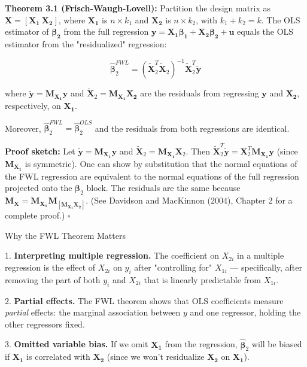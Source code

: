 \textbf{Theorem 3.1 (Frisch-Waugh-Lovell):} Partition the design matrix as $\mathbf{X} = [\mathbf{X_1} \: \mathbf{X_2}]$, where $\mathbf{X_1}$ is $n \times k_1$ and $\mathbf{X_2}$ is $n \times k_2$, with $k_1 + k_2 = k$. The OLS estimator of $\boldsymbol{\beta_2}$ from the full regression $\mathbf{y} = \mathbf{X_1}\boldsymbol{\beta_1} + \mathbf{X_2}\boldsymbol{\beta_2} + \mathbf{u}$ equals the OLS estimator from the "residualized" regression:

\[
\hat{\boldsymbol{\beta}}_2^{FWL} = (\tilde{\mathbf{X}}_2^T \tilde{\mathbf{X}}_2)^{-1} \tilde{\mathbf{X}}_2^T \tilde{\mathbf{y}}
\]

where $\tilde{\mathbf{y}} = \mathbf{M_{X_1}}\mathbf{y}$ and $\tilde{\mathbf{X}}_2 = \mathbf{M_{X_1}}\mathbf{X_2}$ are the residuals from regressing $\mathbf{y}$ and $\mathbf{X_2}$, respectively, on $\mathbf{X_1}$.

Moreover, $\hat{\boldsymbol{\beta}}_2^{FWL} = \hat{\boldsymbol{\beta}}_2^{OLS}$ and the residuals from both regressions are identical.

\textbf{Proof sketch:} Let $\tilde{\mathbf{y}} = \mathbf{M_{X_1}}\mathbf{y}$ and $\tilde{\mathbf{X}}_2 = \mathbf{M_{X_1}}\mathbf{X}_2$. Then $\tilde{\mathbf{X}}_2^T\tilde{\mathbf{y}} = \mathbf{X}_2^T\mathbf{M_{X_1}}\mathbf{y}$ (since $\mathbf{M_{X_1}}$ is symmetric). One can show by substitution that the normal equations of the FWL regression are equivalent to the normal equations of the full regression projected onto the $\boldsymbol{\beta}_2$ block. The residuals are the same because $\mathbf{M_X} = \mathbf{M_{X_1}}\mathbf{M}_{[\mathbf{M_{X_1}}\mathbf{X_2}]}$. (See Davidson and MacKinnon (2004), Chapter 2 for a complete proof.) $\square$

\begin{keybox}{Why the FWL Theorem Matters}

1. \textbf{Interpreting multiple regression.} The coefficient on $X_{2i}$ in a multiple regression is the effect of $X_{2i}$ on $y_i$ after "controlling for" $X_{1i}$ --- specifically, after removing the part of both $y_i$ and $X_{2i}$ that is linearly predictable from $X_{1i}$.

2. \textbf{Partial effects.} The FWL theorem shows that OLS coefficients measure \textit{partial} effects: the marginal association between $y$ and one regressor, holding the other regressors fixed.

3. \textbf{Omitted variable bias.} If we omit $\mathbf{X_1}$ from the regression, $\hat{\boldsymbol{\beta}}_2$ will be biased if $\mathbf{X_1}$ is correlated with $\mathbf{X_2}$ (since we won't residualize $\mathbf{X_2}$ on $\mathbf{X_1}$).
\end{keybox}

